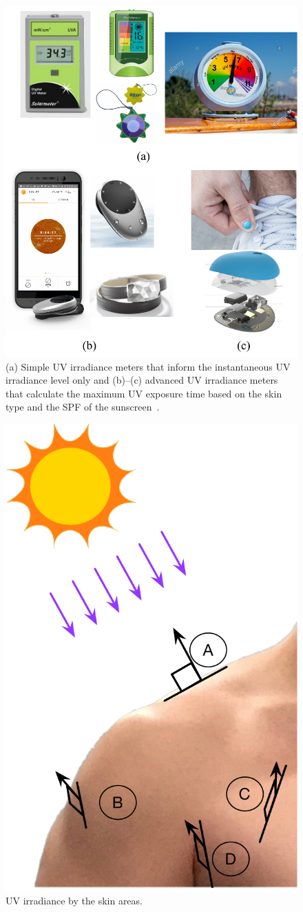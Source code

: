 \documentclass[journal]{IEEEtran}
\begin{document}
\begin{figure}
\centering
\includegraphics[width=0.8\hsize]{Figures/UVI_meter.pdf}
\caption{(a) Simple UV irradiance meters that inform the instantaneous UV irradiance level only and (b)--(c) advanced UV irradiance meters that calculate the maximum UV exposure time based on the skin type and the SPF of the sunscreen~\cite{Netatmo, Ultra, LOreal}.}
\label{fig:UVI_meters}
\end{figure}

\begin{figure}
\centering
\includegraphics[width=0.4\hsize]{Figures/UV_skin_areas.pdf}
\caption{UV irradiance by the skin areas.}
\label{fig:UV_exposure_skin}
\end{figure}
\end{document}
